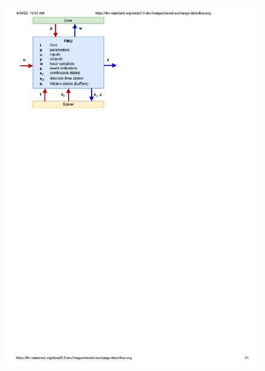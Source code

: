 \begin{figure}[hbt!]
    \centering
    \includegraphics[scale=0.6]{figures/fmi_me.pdf}

\end{figure}
